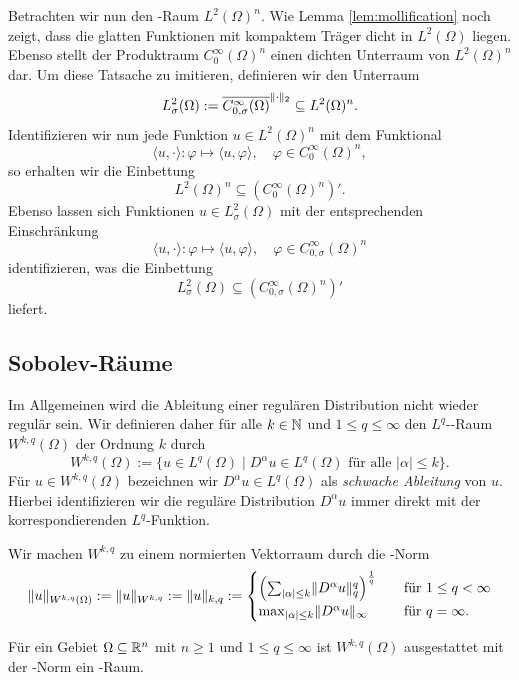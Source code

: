 Betrachten wir nun den \hilbert\hyp{}Raum $L^2(\Omega)^n$.
Wie Lemma \ref{lem:mollification} noch zeigt, dass die glatten Funktionen mit kompaktem Träger dicht in $L^2(\Omega)$ liegen. 
Ebenso stellt der Produktraum $C_0^\infty(\Omega)^n$ einen dichten Unterraum von $L^2(\Omega)^n$ dar.
Um diese Tatsache zu imitieren, definieren wir den Unterraum 
$$
  L^2_\sigma(\Omega) 
  := \overline{C_{0,\sigma}^\infty(\Omega)}^{\lVert \cdot \rVert_2}
  \subseteq L^2(\Omega)^n.
$$
Identifizieren wir nun jede Funktion $u \in L^2(\Omega)^n$ mit dem Funktional
$$
\langle u, \cdot \rangle \colon \varphi \mapsto \langle u, \varphi \rangle, \quad \varphi \in C_0^\infty(\Omega)^n,
$$
so erhalten wir die Einbettung 
$$
  L^2(\Omega)^n \subseteq (C_0^\infty(\Omega)^n)'.
$$
Ebenso lassen sich Funktionen $u \in L^2_\sigma(\Omega)$ mit der entsprechenden Einschränkung
$$
\langle u, \cdot \rangle \colon \varphi \mapsto \langle u, \varphi \rangle, \quad \varphi \in C_{0,\sigma}^\infty(\Omega)^n
$$
identifizieren, was die Einbettung
$$
  L^2_\sigma(\Omega) \subseteq (C_{0,\sigma}^\infty(\Omega)^n)'
$$
liefert.

\subsection{Sobolev-Räume}

Im Allgemeinen wird die Ableitung einer regulären Distribution nicht wieder regulär sein.
Wir definieren daher für alle $k \in \mathbb{N}$ und $1 \leq q \leq \infty$ den $L^q$\hyp{}\sobolev\hyp{}Raum $W^{k,q}(\Omega)$ der Ordnung $k$ durch
$$
W^{k,q}(\Omega) := \{ u \in L^q(\Omega) \mid D^\alpha u \in L^q(\Omega) \text{ für alle } |\alpha| \leq k\}.
$$
Für $u \in W^{k,q}(\Omega)$ bezeichnen wir $D^\alpha u \in L^q(\Omega)$ als \emph{schwache Ableitung} von $u$.
Hierbei identifizieren wir die reguläre Distribution $D^\alpha u$ immer direkt mit der korrespondierenden $L^q$\hyp{}Funktion.

Wir machen $W^{k,q}$ zu einem normierten Vektorraum durch die \sobolev\hyp{}Norm
$$
  \lVert u \rVert_{W^{k,q}(\Omega)} 
  := \lVert u \rVert_{W^{k,q}} 
  := \lVert u \rVert_{k,q} 
  := \begin{cases} 
    \left(\sum_{|\alpha| \leq k} \lVert D^\alpha u \rVert_q^q \right)^\frac{1}{q}\quad&\text{für } 1 \leq q < \infty \\
    \max_{|\alpha| \leq k} \lVert D^\alpha u \rVert_\infty \quad&\text{für }q = \infty.
    \end{cases}
$$

\begin{lem}
  Für ein Gebiet $\Omega \subseteq \mathbb{R}^n$ mit $n \geq 1$ und $1 \leq q \leq \infty$ ist $W^{k,q}(\Omega)$ ausgestattet mit der \sobolev\hyp{}Norm ein \banach\hyp{}Raum.
\end{lem}

